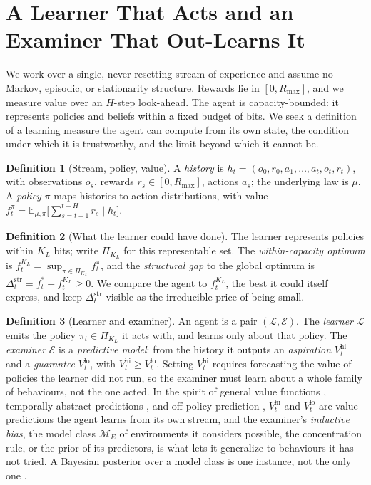\documentclass[10pt]{article} %
\theoremstyle{definition}
\newtheorem{definition}{Definition}
\theoremstyle{plain}
\newcommand{\Ex}{\mathbb{E}}
\newcommand{\ModE}{\mathcal{M}_E}
\newcommand{\PiK}{\Pi_{K_L}}
\newcommand{\Vlow}{V^{\mathrm{lo}}_t}
\newcommand{\Vhi}{V^{\mathrm{hi}}_t}
\newcommand{\Rmax}{R_{\max}}
\newcommand{\Dstruct}{\Delta^{\mathrm{str}}}
\begin{document}
\section{A Learner That Acts and an Examiner That Out-Learns It}
\label{sec:defs}

We work over a single, never-resetting stream of experience and assume no Markov, episodic, or stationarity structure. Rewards lie in $[0,\Rmax]$, and we measure value over an $H$-step look-ahead. The agent is capacity-bounded: it represents policies and beliefs within a fixed budget of bits. We seek a definition of a learning measure the agent can compute from its own state, the condition under which it is trustworthy, and the limit beyond which it cannot be.

\begin{definition}[Stream, policy, value]
\label{def:basic}
A \emph{history} is $h_t = (o_0,r_0,a_1,\dots,a_t,o_t,r_t)$, with observations $o_s$, rewards $r_s \in [0,\Rmax]$, actions $a_s$; the underlying law is $\mu$. A \emph{policy} $\pi$ maps histories to action distributions, with value $f^{\pi}_t = \Ex_{\mu,\pi}\!\big[\sum_{s=t+1}^{t+H} r_s \mid h_t\big]$.
\end{definition}

\begin{definition}[What the learner could have done]
\label{def:capcomp}
The learner represents policies within $K_L$ bits; write $\PiK$ for this representable set. The \emph{within-capacity optimum} is $f^{K_L}_t = \sup_{\pi \in \PiK} f^{\pi}_t$, and the \emph{structural gap} to the global optimum is $\Dstruct_t = f^{*}_t - f^{K_L}_t \ge 0$. We compare the agent to $f^{K_L}_t$, the best it could itself express, and keep $\Dstruct_t$ visible as the irreducible price of being small.
\end{definition}

\begin{definition}[Learner and examiner]
\label{def:agent}
An agent is a pair $(\mathcal{L},\mathcal{E})$. The \emph{learner} $\mathcal{L}$ emits the policy $\pi_t \in \PiK$ it acts with, and learns only about that policy. The \emph{examiner} $\mathcal{E}$ is a \emph{predictive model}: from the history it outputs an \emph{aspiration} $\Vhi$ and a \emph{guarantee} $\Vlow$, with $\Vhi \ge \Vlow$. Setting $\Vhi$ requires forecasting the value of policies the learner did not run, so the examiner must learn about a whole family of behaviours, not the one acted. In the spirit of general value functions \citep{sutton2011horde,modayil2014nexting}, temporally abstract predictions \citep{suttonprecupsingh1999}, and off-policy prediction \citep{precup2001offpolicy}, $\Vhi$ and $\Vlow$ are value predictions the agent learns from its own stream, and the examiner's \emph{inductive bias}, the model class $\ModE$ of environments it considers possible, the concentration rule, or the prior of its predictors, is what lets it generalize to behaviours it has not tried. A Bayesian posterior over a model class is one instance, not the only one \citep{osband2013psrl}.
\end{definition}
\end{document}
